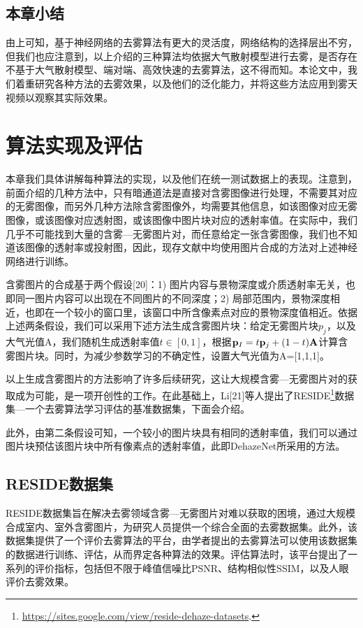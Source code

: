 \documentclass[a4paper, 12pt]{report}
\begin{document}
\section{本章小结\quad}
	由上可知，基于神经网络的去雾算法有更大的灵活度，网络结构的选择层出不穷，但我们也应注意到，以上介绍的三种算法均依据大气散射模型进行去雾，是否存在不基于大气散射模型、端对端、高效快速的去雾算法，这不得而知。本论文中，我们着重研究各种方法的去雾效果，以及他们的泛化能力，并将这些方法应用到雾天视频以观察其实际效果。

\chapter{算法实现及评估\quad}

本章我们具体讲解每种算法的实现，以及他们在统一测试数据上的表现。注意到，前面介绍的几种方法中，只有暗通道法是直接对含雾图像进行处理，不需要其对应的无雾图像，而另外几种方法除含雾图像外，均需要其他信息，如该图像对应无雾图像，或该图像对应透射图，或该图像中图片块对应的透射率值。在实际中，我们几乎不可能找到大量的含雾—无雾图片对，而任意给定一张含雾图像，我们也不知道该图像的透射率或投射图，因此，现存文献中均使用图片合成的方法对上述神经网络进行训练。

含雾图片的合成基于两个假设[20]：1) 图片内容与景物深度或介质透射率无关，也即同一图片内容可以出现在不同图片的不同深度；2) 局部范围内，景物深度相近，也即在一个较小的窗口里，该窗口中所含像素点对应的景物深度值相近。依据上述两条假设，我们可以采用下述方法生成含雾图片块：给定无雾图片块$p_j$，以及大气光值A，我们随机生成透射率值$t\in [0,1]$，根据${\bf p}_I = t{\bf p}_j + (1 - t){\bf A}$计算含雾图片块。同时，为减少参数学习的不确定性，设置大气光值为A=[1,1,1]。

以上生成含雾图片的方法影响了许多后续研究，这让大规模含雾—无雾图片对的获取成为可能，是一项开创性的工作。在此基础上，Li[21]等人提出了RESIDE\footnote{\url{https://sites.google.com/view/reside-dehaze-datasets}.}数据集—一个去雾算法学习评估的基准数据集，下面会介绍。

此外，由第二条假设可知，一个较小的图片块具有相同的透射率值，我们可以通过图片块预估该图片块中所有像素点的透射率值，此即DehazeNet所采用的方法。

\section{RESIDE数据集\quad}
RESIDE数据集旨在解决去雾领域含雾—无雾图片对难以获取的困境，通过大规模合成室内、室外含雾图片，为研究人员提供一个综合全面的去雾数据集。此外，该数据集提供了一个评价去雾算法的平台，由学者提出的去雾算法可以使用该数据集的数据进行训练、评估，从而界定各种算法的效果。评估算法时，该平台提出了一系列的评价指标，包括但不限于峰值信噪比PSNR、结构相似性SSIM，以及人眼评价去雾效果。
\end{document}
